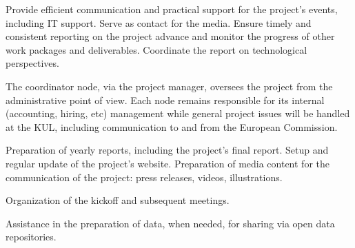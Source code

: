 \begin{workpackage}[id=management,type=MGT,wphases=0-48!.2,
  title=Project Management,short=Management,
  lead=KUL,KULRM=24]

\begin{wpobjectives}

Provide efficient communication and practical support for the project's events,
including IT support.
%
Serve as contact for the media.
%
Ensure timely and consistent reporting on the project advance and monitor the
progress of other work packages and deliverables.
%
Coordinate the report on technological perspectives.

\end{wpobjectives}

\begin{wpdescription}

The coordinator node, via the project manager, oversees the project from the
administrative point of view. Each node remains responsible for its internal
(accounting, hiring, etc) management while general project issues will be
handled at the KUL, including communication to and from the European Commission.

\end{wpdescription}

\begin{tasklist}
\begin{task}[title=Communication,id=mgt-comm,lead=KUL,PM=6,wphases=0-48!0.3]
Preparation of yearly reports, including the project's final report.
%
Setup and regular update of the project's website.
%
Preparation of media content for the communication of the project: press
releases, videos, illustrations.
\end{task}
\begin{task}[title=Meetings,id=mgt-meetings,lead=KUL,PM=6,wphases=0-48!0.15]
Organization of the kickoff and subsequent meetings.
\end{task}
\begin{task}[title=IT,id=mgt-IT,lead=KUL,PM=6,wphases=0-48!0.05]
Assistance in the preparation of data, when needed, for sharing via open data repositories.
\end{task}
\end{tasklist}


\end{workpackage}
